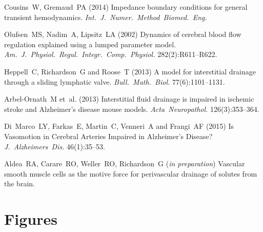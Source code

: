 \documentclass{frontiersFPHY} %
\begin{document}
\begin{thebibliography}{10}
Cousins~W, Gremaud~PA (2014) Impedance boundary conditions for general transient hemodynamics. {\em Int.~J.~Numer.~Method~Biomed.~Eng.}
  
Olufsen~MS, Nadim~A, Lipsitz~LA (2002) Dynamics of cerebral blood flow regulation explained using a lumped parameter model. {\em Am.~J.~Physiol.~Regul.~Integr.~Comp.~Physiol.} 282(2):R611--R622.

Heppell~C, Richardson~G and Roose~T (2013) A model for interstitial drainage through a sliding lymphatic valve. {\em Bull.~Math.~Biol.} 77(6):1101--1131.

Arbel-Ornath~M et~al. (2013) Interstitial fluid drainage is impaired in ischemic stroke and Alzheimer's disease mouse models. {\em Acta~Neuropathol.} 126(3):353--364.

Di~Marco~LY, Farkas~E, Martin~C, Venneri~A and Frangi~AF (2015) Is Vasomotion in Cerebral Arteries Impaired in Alzheimer's Disease? {\em J.~Alzheimers~Dis.} 46(1):35--53.

Aldea~RA, Carare~RO, Weller~RO, Richardson~G ({\em in preparation}) Vascular smooth muscle cells as the motive force for perivascular drainage of solutes from the brain. 
\end{thebibliography}


\section*{Figures}

\end{document}
